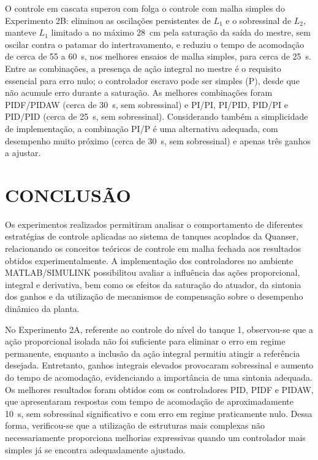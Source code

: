 \documentclass[a4paper,12pt]{article}
\begin{document}
\begin{justify}
    \hspace{4ex}O controle em cascata superou com folga o controle com malha simples do Experimento 2B: eliminou as oscilações persistentes de $L_1$ e o sobressinal de $L_2$, manteve $L_1$ limitado a no máximo 28~cm pela saturação da saída do mestre, sem oscilar contra o patamar do intertravamento, e reduziu o tempo de acomodação de cerca de 55 a 60~s, nos melhores ensaios de malha simples, para cerca de 25~s. Entre as combinações, a presença de ação integral no mestre é o requisito essencial para erro nulo; o controlador escravo pode ser simples (P), desde que não acumule erro durante a saturação. As melhores combinações foram PIDF/PIDAW (cerca de 30~s, sem sobressinal) e PI/PI, PI/PID, PID/PI e PID/PID (cerca de 25~s, sem sobressinal). Considerando também a simplicidade de implementação, a combinação PI/P é uma alternativa adequada, com desempenho muito próximo (cerca de 30~s, sem sobressinal) e apenas três ganhos a ajustar.
\end{justify}

\newpage


\thispagestyle{main}

\section{CONCLUSÃO}

\begin{justify}
    \hspace{4ex}Os experimentos realizados permitiram analisar o comportamento de diferentes estratégias de controle aplicadas ao sistema de tanques acoplados da Quanser, relacionando os conceitos teóricos de controle em malha fechada aos resultados obtidos experimentalmente. A implementação dos controladores no ambiente MATLAB/SIMULINK possibilitou avaliar a influência das ações proporcional, integral e derivativa, bem como os efeitos da saturação do atuador, da sintonia dos ganhos e da utilização de mecanismos de compensação sobre o desempenho dinâmico da planta.
\end{justify}

\begin{justify}
    \hspace{4ex}No Experimento 2A, referente ao controle do nível do tanque 1, observou-se que a ação proporcional isolada não foi suficiente para eliminar o erro em regime permanente, enquanto a inclusão da ação integral permitiu atingir a referência desejada. Entretanto, ganhos integrais elevados provocaram sobressinal e aumento do tempo de acomodação, evidenciando a importância de uma sintonia adequada. Os melhores resultados foram obtidos com os controladores PID, PIDF e PIDAW, que apresentaram respostas com tempo de acomodação de aproximadamente 10~s, sem sobressinal significativo e com erro em regime praticamente nulo. Dessa forma, verificou-se que a utilização de estruturas mais complexas não necessariamente proporciona melhorias expressivas quando um controlador mais simples já se encontra adequadamente ajustado.
\end{justify}
\end{document}
